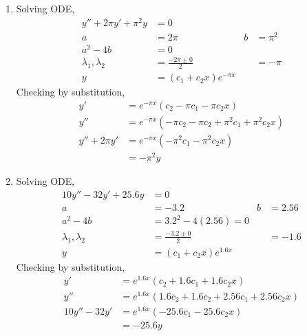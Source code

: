 \begin{enumerate}
    \item Solving ODE,
          \begin{align}
              y'' + 2\pi y' + \pi ^{2}y & = 0                           \\
              a                         & = 2\pi                      &
              b                         & = \pi ^{2}                    \\
              a^{2} - 4b                & = 0                           \\
              \lambda_{1}, \lambda_{2}  & = \frac{-2\pi \pm 0}{2}     &
                                        & = -\pi                        \\
              y                         & = (c_{1}+ c_{2}x)e^{-\pi x}
          \end{align}
          Checking by substitution,
          \begin{align}
              y'           & = e^{-\pi x}(c_{2} - \pi c_{1} - \pi c_{2}x)      \\
              y''          & = e^{-\pi x}(-\pi c_{2}-\pi c_{2} + \pi ^{2}c_{1}
              + \pi ^{2}c_{2}x)                                                \\
              y''+ 2\pi y' & = e^{-\pi x}(-\pi ^{2}c_{1} - \pi ^{2}c_{2}x)     \\
                           & = -\pi ^{2}y
          \end{align}

    \item Solving ODE,
          \begin{align}
              10y'' - 32y' + 25.6y     & = 0                          \\
              a                        & = -3.2                     &
              b                        & = 2.56                       \\
              a^{2} - 4b               & = 3.2^{2} - 4(2.56) = 0      \\
              \lambda_{1}, \lambda_{2} & = \frac{-3.2 \pm 0}{2}     &
                                       & = -1.6                       \\
              y                        & = (c_{1}+ c_{2}x)e^{1.6 x}
          \end{align}
          Checking by substitution,
          \begin{align}
              y'          & = e^{1.6 x}(c_{2} + 1.6 c_{1} + 1.6 c_{2}x)               \\
              y''         & = e^{1.6 x}(1.6 c_{2}+1.6 c_{2} + 2.56c_{1} + 2.56c_{2}x) \\
              10y''- 32y' & = e^{1.6 x}(-25.6c_{1} - 25.6c_{2}x)                      \\
                          & = -25.6y
          \end{align}


\end{enumerate}
